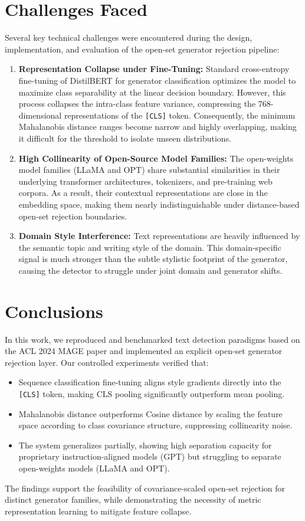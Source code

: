 \section{Challenges Faced}\label{Chapter-4-Challenges}
\noindent Several key technical challenges were encountered during the design, implementation, and evaluation of the open-set generator rejection pipeline:
\begin{enumerate}
    \item \textbf{Representation Collapse under Fine-Tuning:} Standard cross-entropy fine-tuning of DistilBERT for generator classification optimizes the model to maximize class separability at the linear decision boundary. However, this process collapses the intra-class feature variance, compressing the 768-dimensional representations of the \texttt{[CLS]} token. Consequently, the minimum Mahalanobis distance ranges become narrow and highly overlapping, making it difficult for the threshold to isolate unseen distributions.
    \item \textbf{High Collinearity of Open-Source Model Families:} The open-weights model families (LLaMA and OPT) share substantial similarities in their underlying transformer architectures, tokenizers, and pre-training web corpora. As a result, their contextual representations are close in the embedding space, making them nearly indistinguishable under distance-based open-set rejection boundaries.
    \item \textbf{Domain Style Interference:} Text representations are heavily influenced by the semantic topic and writing style of the domain. This domain-specific signal is much stronger than the subtle stylistic footprint of the generator, causing the detector to struggle under joint domain and generator shifts.
\end{enumerate}

\section{Conclusions}\label{Chapter-4-Conclusions}
\noindent In this work, we reproduced and benchmarked text detection paradigms based on the ACL 2024 MAGE paper and implemented an explicit open-set generator rejection layer. Our controlled experiments verified that:
\begin{itemize}
    \item Sequence classification fine-tuning aligns style gradients directly into the \texttt{[CLS]} token, making CLS pooling significantly outperform mean pooling.
    \item Mahalanobis distance outperforms Cosine distance by scaling the feature space according to class covariance structure, suppressing collinearity noise.
    \item The system generalizes partially, showing high separation capacity for proprietary instruction-aligned models (GPT) but struggling to separate open-weights models (LLaMA and OPT).
\end{itemize}
The findings support the feasibility of covariance-scaled open-set rejection for distinct generator families, while demonstrating the necessity of metric representation learning to mitigate feature collapse.

